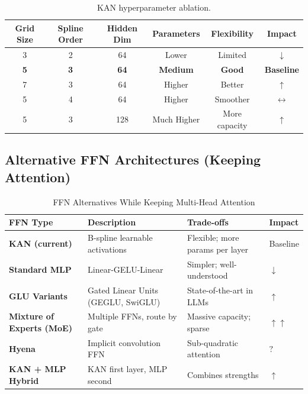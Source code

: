 \documentclass[11pt,a4paper]{article}
\begin{document}
\begin{table}[H]
\centering
\begin{tabular}{cccccc}
\toprule
\textbf{Grid Size} & \textbf{Spline Order} & \textbf{Hidden Dim} & \textbf{Parameters} & \textbf{Flexibility} & \textbf{Impact} \\
\midrule
3 & 2 & 64 & Lower & Limited & \textcolor{negative}{$\downarrow$} \\
\rowcolor{lightgray}
\textbf{5} & \textbf{3} & \textbf{64} & \textbf{Medium} & \textbf{Good} & \textbf{Baseline} \\
7 & 3 & 64 & Higher & Better & \textcolor{positive}{$\uparrow$} \\
5 & 4 & 64 & Higher & Smoother & \textcolor{neutral}{$\leftrightarrow$} \\
5 & 3 & 128 & Much Higher & More capacity & \textcolor{positive}{$\uparrow$} \\
\bottomrule
\end{tabular}
\caption{KAN hyperparameter ablation.}
\end{table}

\subsection{Alternative FFN Architectures (Keeping Attention)}

\begin{longtable}{L{3cm}L{4cm}L{4cm}C{1.5cm}}
\caption{FFN Alternatives While Keeping Multi-Head Attention} \\
\toprule
\textbf{FFN Type} & \textbf{Description} & \textbf{Trade-offs} & \textbf{Impact} \\
\midrule
\endfirsthead
\bottomrule
\endlastfoot

\textbf{KAN (current)} & B-spline learnable activations & Flexible; more params per layer & Baseline \\

\textbf{Standard MLP} & Linear-GELU-Linear & Simpler; well-understood & \textcolor{negative}{$\downarrow$} \\

\textbf{GLU Variants} & Gated Linear Units (GEGLU, SwiGLU) & State-of-the-art in LLMs & \textcolor{positive}{$\uparrow$} \\

\textbf{Mixture of Experts (MoE)} & Multiple FFNs, route by gate & Massive capacity; sparse & \textcolor{positive}{$\uparrow\uparrow$} \\

\textbf{Hyena} & Implicit convolution FFN & Sub-quadratic attention & \textcolor{uncertain}{$?$} \\

\textbf{KAN + MLP Hybrid} & KAN first layer, MLP second & Combines strengths & \textcolor{positive}{$\uparrow$} \\

\end{longtable}
\end{document}
